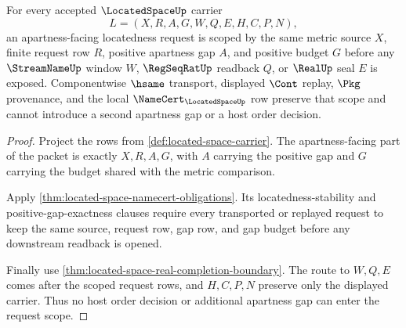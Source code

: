 \begin{theorem}
\label{thm:located-space-apartness-request-scope}
For every accepted $\LocatedSpaceUp$ carrier
$$
L=(X,R,A,G,W,Q,E,H,C,P,N),
$$
an apartness-facing locatedness request is scoped by the same metric source $X$, finite request row $R$, positive apartness gap $A$, and positive budget $G$ before any $\StreamNameUp$ window $W$, $\RegSeqRatUp$ readback $Q$, or $\RealUp$ seal $E$ is exposed. Componentwise $\hsame$ transport, displayed $\Cont$ replay, $\Pkg$ provenance, and the local $\NameCert_{\LocatedSpaceUp}$ row preserve that scope and cannot introduce a second apartness gap or a host order decision.
\end{theorem}
\begin{proof}
Project the rows from \autoref{def:located-space-carrier}. The apartness-facing part of the packet is exactly $X,R,A,G$, with $A$ carrying the positive gap and $G$ carrying the budget shared with the metric comparison.

Apply \autoref{thm:located-space-namecert-obligations}. Its locatedness-stability and positive-gap-exactness clauses require every transported or replayed request to keep the same source, request row, gap row, and gap budget before any downstream readback is opened.

Finally use \autoref{thm:located-space-real-completion-boundary}. The route to $W,Q,E$ comes after the scoped request rows, and $H,C,P,N$ preserve only the displayed carrier. Thus no host order decision or additional apartness gap can enter the request scope.
\end{proof}

